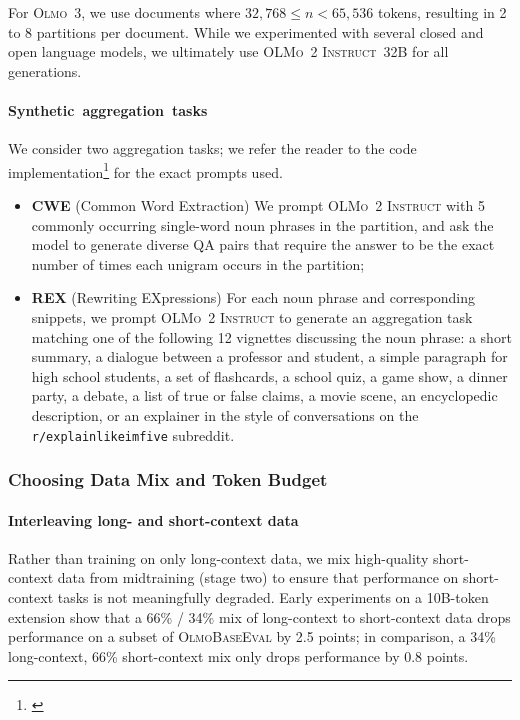 \documentclass[table]{ai2style/ai2}
\newcommand{\oldOlmo}{OLMo\xspace}
\newcommand{\newOlmo}{Olmo\xspace}
\newcommand{\olmotooinstruct}{\textsc{\oldOlmo~2 Instruct}\xspace}
\newcommand{\olmothree}{\textsc{\newOlmo~3}\xspace}
\newcommand{\olmothreeeval}{\textsc{OlmoBaseEval}\xspace}
\begin{document}
For \olmothree, we use documents where $32,768 \leq n < 65,536$ tokens, resulting in 2 to 8 partitions per document.  While we experimented with several closed and open language models, we ultimately use \textsc{\olmotooinstruct~32B} for all generations.

\paragraph{Synthetic~aggregation~tasks} We consider two aggregation tasks; we refer the reader to the code implementation\footnote{\href{https://github.com/allenai/dolma3/blob/f7def5838c8c2d25e358b2b35b2b752168107ed4/datasets/dolma3_longmino_mix/synthetic_cwe_rex/longmino_synthetic_cwe_rex.py}{}} for the exact prompts used.

\begin{itemize}
	\item {\bf{CWE}} (Common Word Extraction) We prompt \olmotooinstruct with 5 commonly occurring single-word noun phrases in the partition, and ask the model to generate diverse QA pairs that require the answer to be the exact number of times each unigram occurs in the partition;
	\item {\bf{REX}} (Rewriting EXpressions) For each noun phrase and corresponding snippets, we prompt \olmotooinstruct to generate an aggregation task matching one of the following 12 vignettes discussing the noun phrase: a short summary, a dialogue between a professor and student, a simple paragraph for high school students, a set of flashcards, a school quiz, a game show, a dinner party, a debate, a list of true or false claims, a movie scene, an encyclopedic description, or an explainer in the style of conversations on the \texttt{r/explainlikeimfive} subreddit.
\end{itemize}

\subsubsection{Choosing Data Mix and Token Budget}
\label{lc:mix}

\paragraph{Interleaving long- and short-context data}
Rather than training on only long-context data, we mix high-quality short-context data from midtraining (stage two) to ensure that performance on short-context tasks is not meaningfully degraded.
Early experiments on a 10B-token extension show that a 66\% / 34\% mix of long-context to short-context data drops performance on a subset of \olmothreeeval by 2.5 points; in comparison, a 34\% long-context, 66\% short-context mix only drops performance by 0.8 points.
\end{document}
